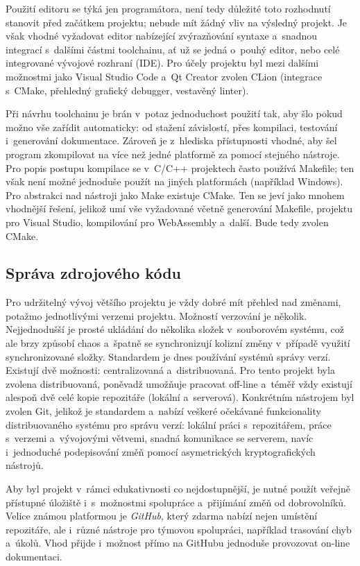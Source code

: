 Použití editoru se týká jen programátora, není tedy důležité toto rozhodnutí stanovit před začátkem projektu; nebude mít žádný vliv na výsledný projekt. Je však vhodné vyžadovat editor nabízející zvýrazňování syntaxe a~snadnou integrací s~dalšími částmi toolchainu, ať už se jedná o~pouhý editor, nebo celé integrované vývojové rozhraní (IDE). Pro účely projektu byl mezi dalšími možnostmi jako Visual Studio Code a~Qt Creator zvolen CLion (integrace s~CMake, přehledný grafický debugger, vestavěný linter).

Při návrhu toolchainu je brán v~potaz jednoduchost použití tak, aby šlo pokud možno vše zařídit automaticky: od stažení závislostí, přes kompilaci, testování i~generování dokumentace. Zároveň je z~hlediska přístupnosti vhodné, aby šel program zkompilovat na více než jedné platformě za pomocí stejného nástroje. Pro popis postupu kompilace se v~C/C++ projektech často používá Makefile; ten však není možné jednoduše použít na jiných platformách (například Windows). Pro abstrakci nad nástroji jako Make existuje CMake. Ten se jeví jako mnohem vhodnější řešení, jelikož umí vše vyžadované včetně generování Makefile, projektu pro Visual Studio, kompilování pro WebAssembly a~další. Bude tedy zvolen CMake.

\subsection{Správa zdrojového kódu}
Pro udržitelný vývoj většího projektu je vždy dobré mít přehled nad změnami, potažmo jednotlivými verzemi projektu. Možností verzování je několik. Nejjednodušší je prosté ukládání do několika složek v~souborovém systému, což ale brzy způsobí chaos a~špatně se synchronizují kolizní změny v~případě využití synchronizované složky. Standardem je dnes používání systémů správy verzí. Existují dvě možnosti: centralizovaná a~distribuovaná. Pro tento projekt byla zvolena distribuovaná, poněvadž umožňuje pracovat off-line a~téměř vždy existují alespoň dvě celé kopie repozitáře (lokální a~serverová). Konkrétním nástrojem byl zvolen Git, jelikož je standardem a~nabízí veškeré očekávané funkcionality distribuovaného systému pro správu verzí: lokální práci s~repozitářem, práce s~verzemi a~vývojovými větvemi, snadná komunikace se serverem, navíc i~jednoduché podepisování změň pomocí asymetrických kryptografických nástrojů.

Aby byl projekt v~rámci edukativnosti co nejdostupnější, je nutné použít veřejně přístupné úložiště i~s~možnostmi spolupráce a~přijímání změň od dobrovolníků. Velice známou platformou je \emph{GitHub}, který zdarma nabízí nejen umístění repozitáře, ale i~různé nástroje pro týmovou spolupráci, například trasování chyb a~úkolů. Vhod přijde i~možnost přímo na GitHubu jednoduše provozovat on-line dokumentaci.

